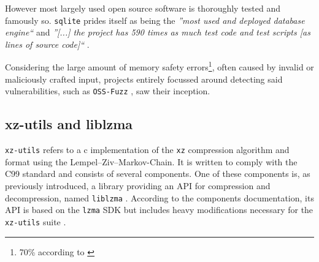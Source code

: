 However most largely used open source software is thoroughly tested and
famously so. \texttt{sqlite} prides itself as being the \textit{''most used and
deployed database engine``} \cite{sqlite2022mostdeployed} and \textit{''[...]
the project has 590 times as much test code and test scripts [as lines of
source code]``} \cite{sqlite2022testing}. 

Considering the large amount of memory safety errors\footnote{70\% according to
\cite{googleUnknownMemorySafety}}, often caused by invalid or maliciously
crafted input, projects entirely focussed around detecting said
vulnerabilities, such as \texttt{OSS-Fuzz} \cite{google2024fuzzing}, saw their
inception.

\subsection{xz-utils and liblzma}

\texttt{xz-utils} refers to a c implementation of the \texttt{xz} compression
algorithm and format using the Lempel–Ziv–Markov-Chain. It is written to comply
with the C99 standard and consists of several components. One of these
components is, as previously introduced, a library providing an API for
compression and decompression, named \texttt{liblzma} \cite{tukaani2024xz}.
According to the components documentation, its API is based on the
\texttt{lzma} SDK but includes heavy modifications necessary for the
\texttt{xz-utils} suite \cite{ccc2024backdoor}.

